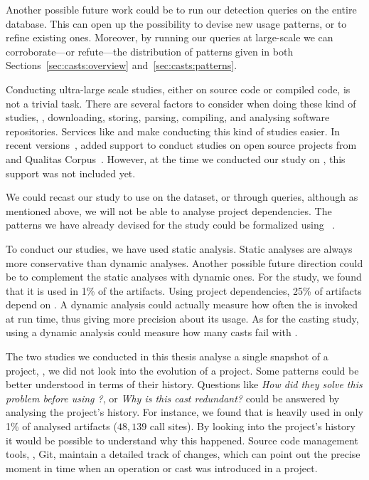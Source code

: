 Another possible future work could be to run our detection queries on the entire \lgtm{} database.
This can open up the possibility to devise new usage patterns,
or to refine existing ones.
Moreover,
by running our queries at large-scale we can corroborate---or refute---the distribution of patterns given in both Sections~\ref{sec:casts:overview} and~\ref{sec:casts:patterns}.

Conducting ultra-large scale studies, either on source code or compiled code, is not a trivial task.
There are several factors to consider when doing these kind of studies,
\eg{}, downloading, storing, parsing, compiling,
and analysing software repositories.
Services like \boa{} and \lgtm{} make conducting this kind of studies easier.
In recent versions~\citep{boa-github},
\boa{} added support to conduct studies on open source projects from \github{} and Qualitas Corpus~\citep{temperoQualitasCorpusCurated2010}.
However, at the time we conducted our study on \unsafe{},
this support was not included yet.

We could recast our \unsafe{} study to use \boa{} on the \github{} dataset,
or \lgtm{} through \ql{} queries, although as mentioned above,
we will not be able to analyse project dependencies.
The patterns we have already devised for the \unsafe{} study could be formalized using \ql{}~\citep{avgustinovQLObjectorientedQueries2016}.

To conduct our studies, we have used static analysis.
Static analyses are always more conservative than dynamic analyses.
Another possible future direction could be to complement the static analyses with dynamic ones.
For the \unsafe{} study,
we found that it is used in 1\% of the \mavencentral{} artifacts.
Using project dependencies, 25\% of artifacts depend on \smu{}.
A dynamic analysis could actually measure how often the \unsafe{} \api{} is invoked at run time,
thus giving more precision about its usage.
As for the casting study,
using a dynamic analysis could measure how many casts fail with .

The two studies we conducted in this thesis analyse a single snapshot of a project,
\ie{}, we did not look into the evolution of a project.
Some patterns could be better understood in terms of their history.
Questions like
\emph{How did they solve this problem before using \unsafe{}?},
or \emph{Why is this cast redundant?}
could be answered by analysing the project's history. 
For instance,
we found that \smu{} is heavily used in only 1\% of analysed artifacts
($48,139$ call sites).
By looking into the project's history it would be possible to understand why this happened.
Source code management tools, \eg{}, Git,
maintain a detailed track of changes,
which can point out the precise moment in time when an \unsafe{} operation or cast was introduced in a project.

